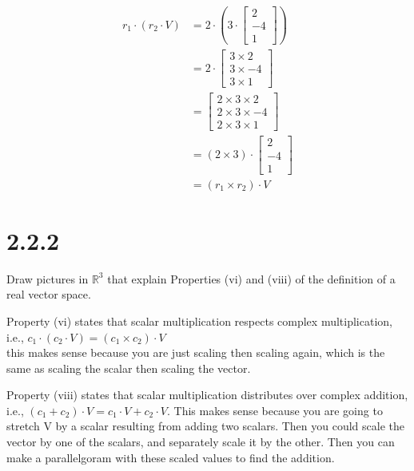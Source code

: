 \documentclass[11pt]{article}
\begin{document}
\begin{align*}
	r_1 \cdot (r_2 \cdot V) &= 2 \cdot (3 \cdot \begin{bmatrix}2 \\ -4 \\ 1 \end{bmatrix}) \\
		&= 2 \cdot \begin{bmatrix} 3 \times 2 \\  3 \times -4 \\  3 \times 1 \end{bmatrix} \\
		&= \begin{bmatrix} 2 \times 3 \times 2 \\  2 \times 3 \times -4 \\ 2 \times  3 \times 1 \end{bmatrix} \\
			&= (2 \times 3) \cdot  \begin{bmatrix}2 \\ -4 \\ 1 \end{bmatrix}  \\
			&= (r_1 \times r_2) \cdot V 
\end{align*}


\section{2.2.2} Draw pictures in $\mathbb{R}^3$ that explain Properties (vi) and (viii) of the definition of a real vector space. 

Property (vi) states that scalar multiplication respects complex multiplication, i.e., $c_1 \cdot (c_2 \cdot V) = (c_1 \times c_2) \cdot V$ \\
this makes sense because you are just scaling then scaling again, which is the same as scaling the scalar then scaling the vector. 

Property (viii) states that scalar multiplication distributes over complex addition, i.e., $(c_1 + c_2) \cdot V = c_1 \cdot V + c_2 \cdot V $. 
This makes sense because you are going to stretch V by a scalar resulting from adding two scalars. 
Then you could scale the vector by one of the scalars, and separately scale it by the other. 
Then you can make a parallelgoram with these scaled values to find the addition. 

\end{document}
